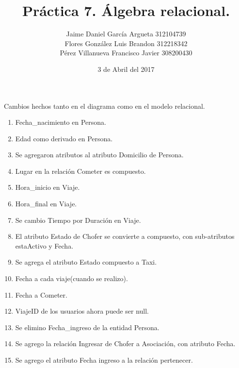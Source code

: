 \documentclass{article}
\title{Práctica 7. Álgebra relacional.}
\author{Jaime Daniel García Argueta 312104739\\
		Flores González Luis Brandon 312218342\\
		Pérez Villanueva Francisco Javier 308200430}
\date{3 de Abril del 2017}
\begin{document}
\maketitle

Cambios hechos tanto en el diagrama como en el modelo relacional.\\
\begin{enumerate}
	\item Fecha\_nacimiento en Persona.
	\item Edad como derivado en Persona.
	\item Se agregaron atributos al atributo Domicilio de Persona.
	\item Lugar en la relación Cometer es compuesto.
	\item Hora\_inicio en Viaje.
	\item Hora\_final en Viaje.
	\item Se cambio Tiempo por Duración en Viaje.
	\item El atributo Estado de Chofer se convierte a compuesto, con sub-atributos estaActivo y Fecha.
	\item Se agrega el atributo Estado compuesto a Taxi.
	\item Fecha a cada viaje(cuando se realizo).
	\item Fecha a Cometer.
	\item ViajeID de los usuarios ahora puede ser null.
	\item Se elimino Fecha\_ingreso de la entidad Persona.
	\item Se agrego la relación Ingresar de Chofer a Asociación, con atributo Fecha.
	\item Se agrego el atributo Fecha ingreso a la relación pertenecer.\\\\\\\\
\end{enumerate}
\end{document}
